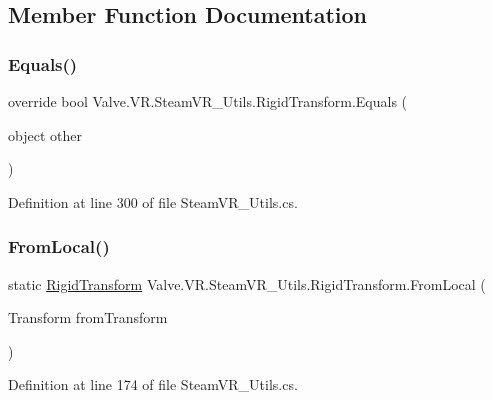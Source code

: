 \subsection{Member Function Documentation}
\mbox{\label{struct_valve_1_1_v_r_1_1_steam_v_r___utils_1_1_rigid_transform_ae5da80c745e0b9f2736a0c5f5b526b2c}} 
\subsubsection{\texorpdfstring{Equals()}{Equals()}}
{\footnotesize\ttfamily override bool Valve.\+V\+R.\+Steam\+V\+R\+\_\+\+Utils.\+Rigid\+Transform.\+Equals (\begin{DoxyParamCaption}\item[{object}]{other }\end{DoxyParamCaption})}



Definition at line 300 of file Steam\+V\+R\+\_\+\+Utils.\+cs.

\mbox{\label{struct_valve_1_1_v_r_1_1_steam_v_r___utils_1_1_rigid_transform_ab8c9c2c5f4c3317704b4969475099d53}} 
\subsubsection{\texorpdfstring{FromLocal()}{FromLocal()}}
{\footnotesize\ttfamily static \mbox{\hyperlink{struct_valve_1_1_v_r_1_1_steam_v_r___utils_1_1_rigid_transform}{Rigid\+Transform}} Valve.\+V\+R.\+Steam\+V\+R\+\_\+\+Utils.\+Rigid\+Transform.\+From\+Local (\begin{DoxyParamCaption}\item[{Transform}]{from\+Transform }\end{DoxyParamCaption})\hspace{0.3cm}{\ttfamily [static]}}



Definition at line 174 of file Steam\+V\+R\+\_\+\+Utils.\+cs.

